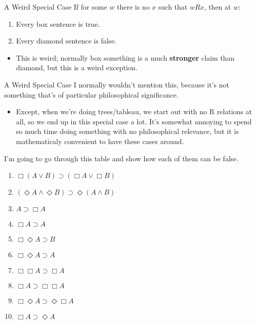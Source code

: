 \documentclass[
  14pt,
  letterpaper,
  ignorenonframetext,
  aspectratio=169,
  handout]{beamer}
\providecommand{\tightlist}{%
  \setlength{\itemsep}{0pt}\setlength{\parskip}{0pt}}\usepackage{longtable,booktabs,array}
\begin{document}
\begin{frame}{A Weird Special Case}
\protect\hypertarget{a-weird-special-case}{}
If for some \(w\) there is no \(x\) such that \(wRx\), then at \(w\):

\begin{enumerate}[<+->]
\tightlist
\item
  Every box sentence is true.
\item
  Every diamond sentence is false.
\end{enumerate}

\begin{itemize}[<+->]
\tightlist
\item
  This is weird; normally box something is a much \textbf{stronger}
  claim than diamond, but this is a weird exception.
\end{itemize}
\end{frame}

\begin{frame}{A Weird Special Case}
\protect\hypertarget{a-weird-special-case-1}{}
I normally wouldn't mention this, because it's not something that's of
particular philosophical significance.

\begin{itemize}[<+->]
\tightlist
\item
  Except, when we're doing trees/tableau, we start out with no R
  relations at all, so we end up in this special case a lot. It's
  somewhat annoying to spend so much time doing something with no
  philosophical relevance, but it is mathematicaly convenient to have
  these cases around.
\end{itemize}
\end{frame}

\begin{frame}
I'm going to go through this table and show how each of them can be
false.

\begin{enumerate}[<+->]
\tightlist
\item
  \(\Box(A \vee B) \supset (\Box A \vee \Box B)\)
\item
  \((\Diamond A \wedge \Diamond B) \supset \Diamond (A \wedge B)\)
\item
  \(A \supset \Box A\)
\item
  \(\Box A \supset A\)
\item
  \(\Box \Diamond A \supset B\)
\item
  \(\Box \Diamond A \supset A\)
\item
  \(\Box \Box A \supset \Box A\)
\item
  \(\Box A \supset \Box \Box A\)
\item
  \(\Box \Diamond A \supset \Diamond \Box A\)
\item
  \(\Box A \supset \Diamond A\)
\end{enumerate}
\end{frame}
\end{document}
